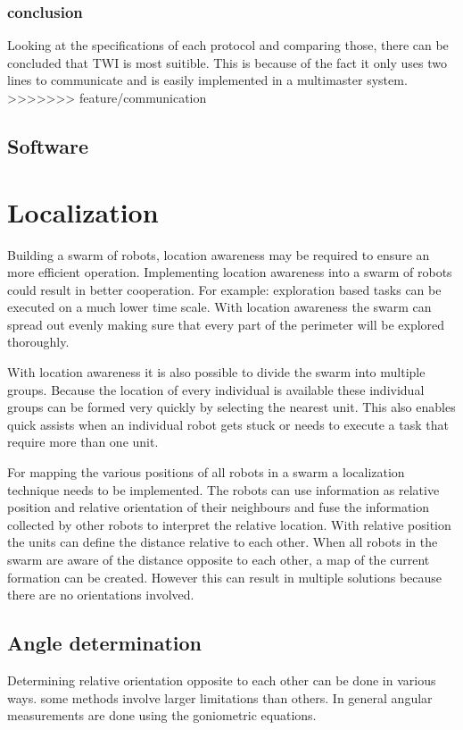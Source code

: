 \documentclass[10pt,a4paper]{article}
\begin{document}
\subsubsection{conclusion}
Looking at the specifications of each protocol and comparing those, there can be concluded that TWI is most suitible. This is because of the fact it only uses two lines to communicate and is easily implemented in a multimaster system.
>>>>>>> feature/communication

\subsection{Software}


\newpage
\section{Localization}
Building a swarm of robots, location awareness may be required to ensure an more efficient operation. Implementing location awareness into a swarm of robots could result in better cooperation. For example: exploration based tasks can be executed on a much lower time scale. With location awareness the swarm can spread out evenly making sure that every part of the perimeter will be explored thoroughly. 

With location awareness it is also possible to divide the swarm into multiple groups. Because the location of every individual is available these individual groups can be formed very quickly by selecting the nearest unit. This also enables quick assists when an individual robot gets stuck or needs to execute a task that require more than one unit.

For mapping the various positions of all robots in a swarm a localization technique needs to be implemented. The robots can use information as relative position and relative orientation of their neighbours and fuse the information collected by other robots to interpret the relative location. With relative position the units can define the distance relative to each other. When all robots in the swarm are aware of the distance opposite to each other, a map of the current formation can be created. However this can result in multiple solutions because there are no orientations involved. 

\subsection{Angle determination}
Determining relative orientation opposite to each other can be done in various ways. some methods involve larger limitations than others. In general angular measurements are done using the goniometric equations.
\end{document}
